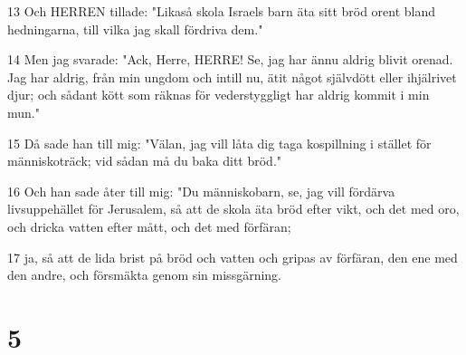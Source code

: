 \par 13 Och HERREN tillade: "Likaså skola Israels barn äta sitt bröd orent bland hedningarna, till vilka jag skall fördriva dem."
\par 14 Men jag svarade: "Ack, Herre, HERRE! Se, jag har ännu aldrig blivit orenad. Jag har aldrig, från min ungdom och intill nu, ätit något självdött eller ihjälrivet djur; och sådant kött som räknas för vederstyggligt har aldrig kommit i min mun."
\par 15 Då sade han till mig: "Välan, jag vill låta dig taga kospillning i stället för människoträck; vid sådan må du baka ditt bröd."
\par 16 Och han sade åter till mig: "Du människobarn, se, jag vill fördärva livsuppehället för Jerusalem, så att de skola äta bröd efter vikt, och det med oro, och dricka vatten efter mått, och det med förfäran;
\par 17 ja, så att de lida brist på bröd och vatten och gripas av förfäran, den ene med den andre, och försmäkta genom sin missgärning.

\chapter{5}

